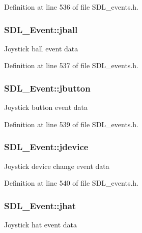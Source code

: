 Definition at line 536 of file S\-D\-L\-\_\-events.\-h.

\hypertarget{union_s_d_l___event_ae433f511e3383d17f8fe02df745ee8f8}{
\subsubsection[{jball}]{ S\-D\-L\-\_\-\-Event\-::jball}}\label{union_s_d_l___event_ae433f511e3383d17f8fe02df745ee8f8}
Joystick ball event data 

Definition at line 537 of file S\-D\-L\-\_\-events.\-h.

\hypertarget{union_s_d_l___event_a591104d64903ae1cf70874fb5d3124ff}{
\subsubsection[{jbutton}]{ S\-D\-L\-\_\-\-Event\-::jbutton}}\label{union_s_d_l___event_a591104d64903ae1cf70874fb5d3124ff}
Joystick button event data 

Definition at line 539 of file S\-D\-L\-\_\-events.\-h.

\hypertarget{union_s_d_l___event_a17514dc19a846ea1b5fbe44123700c4c}{
\subsubsection[{jdevice}]{ S\-D\-L\-\_\-\-Event\-::jdevice}}\label{union_s_d_l___event_a17514dc19a846ea1b5fbe44123700c4c}
Joystick device change event data 

Definition at line 540 of file S\-D\-L\-\_\-events.\-h.

\hypertarget{union_s_d_l___event_a421b40e0f8e01f181c8d5548cff1dd1d}{
\subsubsection[{jhat}]{ S\-D\-L\-\_\-\-Event\-::jhat}}\label{union_s_d_l___event_a421b40e0f8e01f181c8d5548cff1dd1d}
Joystick hat event data 

